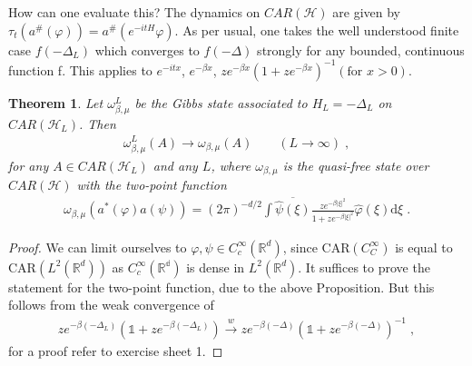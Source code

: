 \documentclass[
a4paper, %
11pt, %
onecolumn, %
openany, %
]{memoir}
\theoremstyle{definition}
\theoremstyle{remark}
\theoremstyle{plain}
\newtheorem{theorem}[definition]{Theorem}
\begin{document}
How can one evaluate this? The dynamics on $CAR(\mathcal{H})$ are given by $\tau_t(a^{\#}(\varphi))=a^{\#}(e^{-itH}\varphi)$. As per usual, one takes the well understood finite case $f(-\Delta_L)$ which converges to $f(-\Delta)$ strongly for any bounded, continuous function f. This applies to $e^{-itx}$, $e^{-\beta x}$, $ze^{-\beta x}(1+ze^{-\beta x})^{-1} (\text{for }x>0)$.
\begin{theorem}
	Let $\omega_{\beta,\mu}^L$ be the Gibbs state associated to $H_L=-\Delta_L$ on $CAR(\mathcal{H}_L)$. Then \begin{align*}
	\omega_{\beta,\mu}^L(A)\overset{}{\longrightarrow}\omega_{\beta,\mu}(A) \qquad (L\rightarrow \infty)\; ,
	\end{align*}
	for any $A\in CAR(\mathcal{H}_{L})$ and any $L$, where $\omega_{\beta,\mu}$ is the quasi-free state over $CAR(\mathcal{H})$ with the two-point function \begin{align}
		\omega_{\beta,\mu}(a^*(\varphi)a(\psi))=(2\pi)^{-d/2}\int\overline{\hat{\psi}(\xi)}\frac{ze^{-\beta |\xi|^2}}{1+ze^{-\beta|\xi|^2}}\hat{\varphi}(\xi)\mathrm{d}\xi\; .
	\end{align}
\end{theorem}
\begin{proof}
We can limit ourselves to $\varphi,\psi\in C_c^{\infty}(\mathbb{R}^d)$, since $\mathrm{CAR}(C_C^{\infty})$ is equal to $\mathrm{CAR}(L^2(\mathbb{R}^d))$ as $C_c^{\infty}(\mathbb{R^d})$ is dense in $L^2(\mathbb{R}^d)$.
	It suffices to prove the statement for the two-point function, due to the above Proposition. But this follows from the weak convergence of \begin{align}
	ze^{-\beta(-\Delta_L)}(\mathds{1}+ze^{-\beta(-\Delta_L)})\overset{w}{\longrightarrow}ze^{-\beta(-\Delta)}\left(\mathds{1}+ze^{-\beta(-\Delta)}\right)^{-1}\; ,
	\end{align}
	for a proof refer to exercise sheet 1.
\end{proof}
\end{document}
